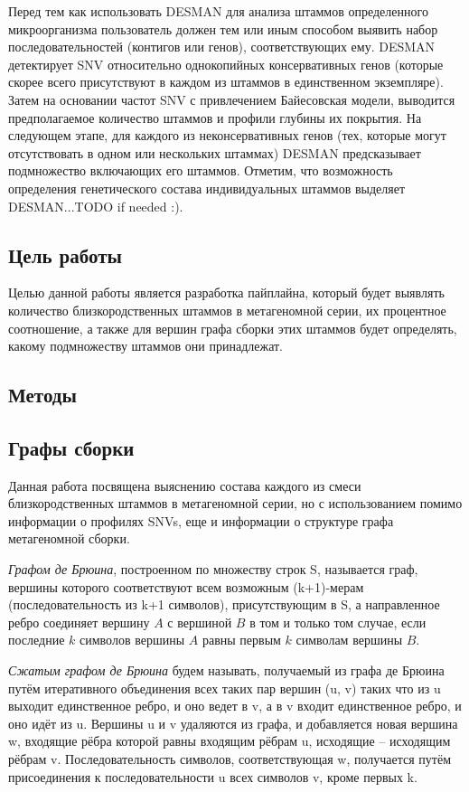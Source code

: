 \documentclass{spbau-diploma}
\begin{document}
 
Перед тем как использовать DESMAN для анализа штаммов определенного микроорганизма пользователь должен тем или иным способом выявить набор последовательностей (контигов или генов), соответствующих ему.
DESMAN детектирует SNV относительно однокопийных консервативных генов (которые скорее всего присутствуют в каждом из штаммов в единственном экземпляре). Затем на основании частот SNV с привлечением Байесовская модели, выводится предполагаемое количество штаммов и профили глубины их покрытия. 
На следующем этапе, для каждого из неконсервативных генов (тех, которые могут отсутствовать в одном или нескольких штаммах) DESMAN предсказывает подмножество включающих его штаммов.
Отметим, что возможность определения генетического состава индивидуальных штаммов выделяет DESMAN...TODO if needed :). 

\subsection{Цель работы}
Целью данной работы является разработка пайплайна, который будет выявлять количество близкородственных штаммов в метагеномной серии, их процентное соотношение, а также для вершин графа сборки этих штаммов будет определять, какому подмножеству штаммов они принадлежат.

\subsection{Методы}
\subsection{Графы сборки}
Данная работа посвящена выяснению состава каждого из смеси близкородственных штаммов в метагеномной серии, но с использованием помимо информации о профилях SNVs, еще и информации о структуре графа метагеномной сборки. 

\textit{Графом де Брюина}, построенном по множеству строк S, называется граф, вершины которого соответствуют всем возможным (k+1)-мерам (последовательность из k+1 символов), присутствующим в S, а направленное ребро соединяет вершину $A$ с вершиной $B$ в том и только том случае, если последние $k$ символов вершины $A$ равны первым $k$ символам вершины $B$.

\textit{Сжатым графом де Брюина} будем называть, получаемый из графа де Брюина путём итеративного объединения всех таких пар вершин (u, v) таких что из u выходит единственное ребро, и оно ведет в v, а в v входит единственное ребро, и оно идёт из u. Вершины u и v удаляются из графа, и добавляется новая вершина w, входящие рёбра которой равны входящим рёбрам u, исходящие -- исходящим рёбрам v. Последовательность символов, соответствующая w, получается путём присоединения к последовательности u всех символов v, кроме первых k.
\end{document}
